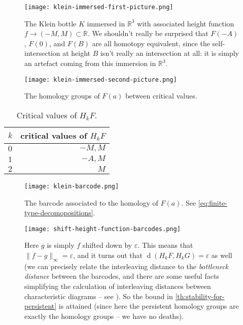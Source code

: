 \documentclass[12pt]{article}
\numberwithin{equation}{subsection}
\numberwithin{theorem}{subsection}
\numberwithin{lemma}{subsection}
\numberwithin{corollary}{subsection}
\numberwithin{definition}{subsection}
\numberwithin{example}{subsection}
\numberwithin{note}{subsection}
\newcommand{\rr}{\mathbb{R}}
\DeclareMathOperator{\dist}{d}
\newcommand{\vare}{\varepsilon}
\begin{document}
            \begin{figure}[hpt]
                \centering
                \texttt{[image: klein-immersed-first-picture.png]}
                \caption{The Klein bottle $K$ immersed in $\rr^3$ with associated height function \mbox{$f\to(-M,M)\subset\rr$}. We shouldn't really be surprised that $F(-A)$, $F(0)$, and $F(B)$ are all homotopy equivalent, since the self-intersection at height $B$ isn't really an intersection at all: it is simply an artefact coming from this immersion in $\rr^3$.}\label{fg:klein-immersed-first-picture}
            \end{figure}

            \begin{figure}[hpt]
                \centering
                \texttt{[image: klein-immersed-second-picture.png]}
                \caption{The homology groups of $F(a)$ between critical values.}\label{fg:klein-immersed-second-picture}
            \end{figure}

            \begin{table}[hpt]
                \centering
                \begin{tabular}{lr}
                    $k$ & critical values of $H_kF$\\
                    \toprule
                    $0$ & $-M,M$\\
                    $1$ & $-A,M$\\
                    $2$ & $M$
                \end{tabular}
                \caption{Critical values of $H_kF$.}\label{tb:critical-values}
            \end{table}

            \begin{figure}[hpt]
                \centering
                \texttt{[image: klein-barcode.png]}
                \caption{The barcode associated to the homology of $F(a)$. See \cref{eq:finite-type-decomopositions}.}\label{fg:klein-barcode}
            \end{figure}

            \begin{figure}[hpt]
                \centering
                \texttt{[image: shift-height-function-barcodes.png]}
                \caption{Here $g$ is simply $f$ shifted down by $\vare$. This means that $\|f-g\|_\infty=\vare$, and it turns out that $\dist(H_kF,H_kG)=\vare$ as well (we can precisely relate the interleaving distance to the \emph{bottleneck distance} between the barcodes, and there are some useful facts simplifying the calculation of interleaving distances between characteristic diagrams -- see \cite[Propositions~4.12,~4.13]{Bubenik:dn}).
                So the bound in \cref{th:stability-for-persistent} is attained (since here the persistent homology groups are exactly the homology groups -- we have no deaths).}\label{fg:shift-height-function-barcodes}
            \end{figure}
\end{document}
